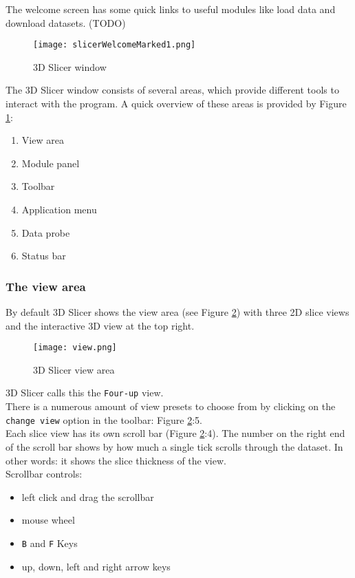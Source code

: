 The welcome screen has some quick links to useful modules like load data and download datasets. (TODO)
\pagebreak
\begin{figure}[h!] %
	\centerline{ %
		\texttt{[image: slicerWelcomeMarked1.png]}}
	\caption{3D Slicer window}\label{fig:slicerView}
\end{figure}

\noindent
The 3D Slicer window consists of several areas, which provide different tools to interact with the program.
A quick overview of these areas is provided by Figure \ref{fig:slicerView}:
\begin{enumerate}
	\item View area
	\item Module panel
	\item Toolbar
	\item Application menu
	\item Data probe
	\item Status bar
\end{enumerate}

\pagebreak

\subsubsection{The view area}\label{sec:view_area}
By default 3D Slicer shows the view area (see Figure \ref{fig:4upview}) with three 2D slice views and the interactive 3D view at the top right.\\
\noindent
\begin{figure}[h!] %
	\centerline{ %
		\texttt{[image: view.png]}}
	\caption{3D Slicer view area}\label{fig:4upview}
\end{figure}

\noindent
3D Slicer calls this the \texttt{Four-up} view.\\

\noindent
There is a numerous amount of view presets to choose from by clicking on the \texttt{change view} option in the toolbar: Figure \ref{fig:4upview}:5.\\

\noindent
Each slice view has its own scroll bar (Figure \ref{fig:4upview}:4).
The number on the right end of the scroll bar shows by how much a single tick scrolls through the dataset.
In other words: it shows the slice thickness of the view.\\
\noindent
Scrollbar controls:
\begin{itemize}
	\item left click and drag the scrollbar
	\item mouse wheel
	\item \texttt{B} and \texttt{F} Keys
	\item up, down, left and right arrow keys
\end{itemize}


